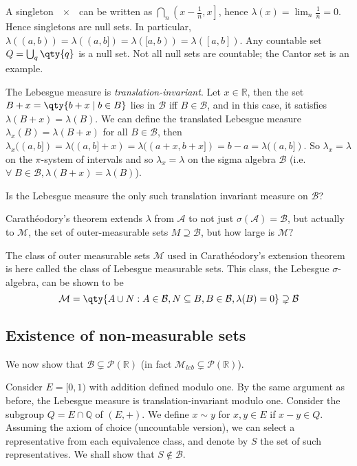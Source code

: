 \begin{remark}
	A singleton $\qty{x}$ can be written as $\bigcap_n \left(x-\frac 1n, x\right]$, hence $\lambda({x}) = \lim_n \frac 1n = 0$.
	Hence singletons are null sets.
	In particular, $\lambda((a,b)) = \lambda((a,b]) = \lambda([a,b)) = \lambda([a,b])$.
	Any countable set $Q = \bigcup_q \qty{q}$ is a null set.
	Not all null sets are countable; the Cantor set is an example.

	The Lebesgue measure is \emph{translation-invariant}.
	Let $x \in \mathbb R$, then the set $B + x = \qty{b + x \mid b \in B}$ lies in $\mathcal B$ iff $B \in \mathcal B$, and in this case, it satisfies $\lambda(B + x) = \lambda(B)$.
	We can define the translated Lebesgue measure $\lambda_x(B) = \lambda(B + x)$ for all $B \in \mathcal B$, then $\lambda_x((a,b]) = \lambda((a, b] + x) = \lambda((a + x, b+x]) = b - a = \lambda((a, b])$.
	So $\lambda_x = \lambda$ on the $\pi$-system of intervals and so $\lambda_x = \lambda$ on the sigma algebra $\mathcal{B}$ (i.e. $\forall \; B \in \mathcal{B}, \lambda(B+x) = \lambda(B)$).

	\begin{question}
		Is the Lebesgue measure the only such translation invariant measure on $\mathcal{B}$?
	\end{question}

	Carath\'eodory's theorem extends $\lambda$ from $\mathcal{A}$ to not just $\sigma(\mathcal{A}) = \mathcal{B}$, but actually to $\mathcal{M}$, the set of outer-measurable sets $M \supseteq \mathcal{B}$, but how large is $\mathcal{M}?$

	The class of outer measurable sets $\mathcal M$ used in Carath\'eodory's extension theorem is here called the class of Lebesgue measurable sets.
	This class, the Lebesgue $\sigma$-algebra, can be shown to be
	\[ \mathcal M = \qty{A \cup N : A \in \mathcal B, N \subseteq B, B \in \mathcal B, \lambda(B) = 0 } \supsetneq \mathcal B \]
\end{remark}

\subsection{Existence of non-measurable sets}

We now show that $\mathcal{B} \subsetneq \mathcal{P}(\mathbb{R})$ (in fact $\mathcal{M}_{leb} \subsetneq \mathcal{P}(\mathbb{R})$).

Consider $E = [0,1)$ with addition defined modulo one.
By the same argument as before, the Lebesgue measure is translation-invariant modulo one.
Consider the subgroup $Q = E \cap \mathbb Q$ of $(E, +)$.
We define $x \sim y$ for $x, y \in E$ if $x - y \in Q$.
Assuming the axiom of choice (uncountable version), we can select a representative from each equivalence class, and denote by $S$ the set of such representatives.
We shall show that $S \notin \mathcal{B}$.

